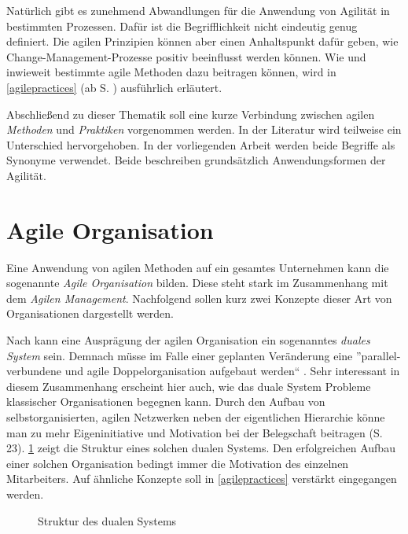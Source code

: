 Natürlich gibt es zunehmend Abwandlungen für die Anwendung von Agilität in bestimmten Prozessen. Dafür ist die Begrifflichkeit nicht eindeutig genug definiert. Die agilen Prinzipien können aber einen Anhaltspunkt dafür geben, wie Change-Management-Prozesse positiv  beeinflusst werden können. Wie und inwieweit bestimmte agile Methoden dazu beitragen können, wird in \ref{agilepractices} (ab S. \pageref{agilepractices}) ausführlich erläutert.

Abschließend zu dieser Thematik soll eine kurze Verbindung zwischen agilen \textit{Methoden} und \textit{Praktiken} vorgenommen werden. In der Literatur wird teilweise ein Unterschied hervorgehoben. In der vorliegenden Arbeit werden beide Begriffe als Synonyme verwendet. Beide beschreiben grundsätzlich Anwendungsformen der Agilität.

\section{Agile Organisation}
\label{background:agileorganisation}

Eine Anwendung von agilen Methoden auf ein gesamtes Unternehmen kann die sogenannte \textit{Agile Organisation} bilden. Diese steht stark im Zusammenhang mit  dem \textit{Agilen Management}. Nachfolgend sollen kurz zwei Konzepte dieser Art von Organisationen dargestellt werden.

Nach  kann eine Ausprägung der agilen Organisation ein sogenanntes \textit{duales System} sein. Demnach müsse im Falle einer geplanten Veränderung eine ''parallel-verbundene und agile Doppelorganisation aufgebaut werden`` \cite[S. 22]{deeken_agiles_2018}. Sehr interessant in diesem Zusammenhang erscheint hier auch, wie das duale System Probleme klassischer Organisationen begegnen kann. Durch den Aufbau von selbstorganisierten, agilen Netzwerken neben der eigentlichen Hierarchie könne man zu mehr Eigeninitiative und Motivation bei der Belegschaft  beitragen (S. 23). \ref{fig:dualessystem} zeigt die Struktur eines solchen dualen Systems. Den erfolgreichen Aufbau einer solchen Organisation bedingt immer die Motivation des einzelnen Mitarbeiters. Auf ähnliche Konzepte soll in \ref{agilepractices} verstärkt eingegangen werden.  

 \begin{figure}
	\centering
	\caption[Struktur des dualen Systems]{Struktur des dualen Systems \protect \cite[S. 23]{deeken_agiles_2018}}
	\label{fig:dualessystem}
\end{figure}

